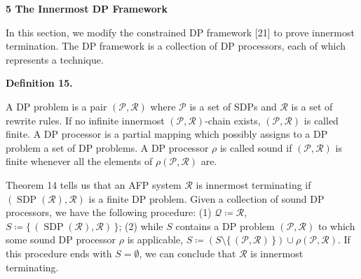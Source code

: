 \documentclass[10pt,a4paper]{amsart}
\providecommand{\coloneq}{\coloneqq}
\begin{document}
 
 


 
\par\medskip\noindent\textbf{5 The Innermost DP Framework}\par
 
 
In this section, we modify the constrained DP framework [21] to prove innermost termination. The DP framework is a collection of DP processors, each of which represents a technique.\par
 
 
 
\par\medskip\noindent\textbf{Definition 15.}\par
 
 
A DP problem is a pair $(\mathcal{P},\mathcal{R})$ where $\mathcal{P}$ is a set of SDPs and $\mathcal{R}$ is a set of rewrite rules. If no infinite innermost $(\mathcal{P},\mathcal{R})$-chain exists, $(\mathcal{P},\mathcal{R})$ is called finite. A DP processor is a partial mapping which possibly assigns to a DP problem a set of DP problems. A DP processor $\rho$ is called sound if $(\mathcal{P},\mathcal{R})$ is finite whenever all the elements of $\rho(\mathcal{P},\mathcal{R})$ are.\par
 
 
 
 
Theorem 14 tells us that an AFP system $\mathcal{R}$ is innermost terminating if $(\operatorname{SDP}(\mathcal{R}),\mathcal{R})$ is a finite DP problem. Given a collection of sound DP processors, we have the following procedure: (1) $\mathcal{Q}\coloneq\mathcal{R}$, $S\coloneq\{\,(\operatorname{SDP}(\mathcal{R}),\mathcal{R})\,\}$; (2) while $S$ contains a DP problem $(\mathcal{P},\mathcal{R})$ to which some sound DP processor $\rho$ is applicable, $S\coloneq(S\setminus\{\,(\mathcal{P},\mathcal{R})\,\})\cup\rho(\mathcal{P},\mathcal{R})$. If this procedure ends with $S=\emptyset$, we can conclude that $\mathcal{R}$ is innermost terminating.\par
 
 
\end{document}
